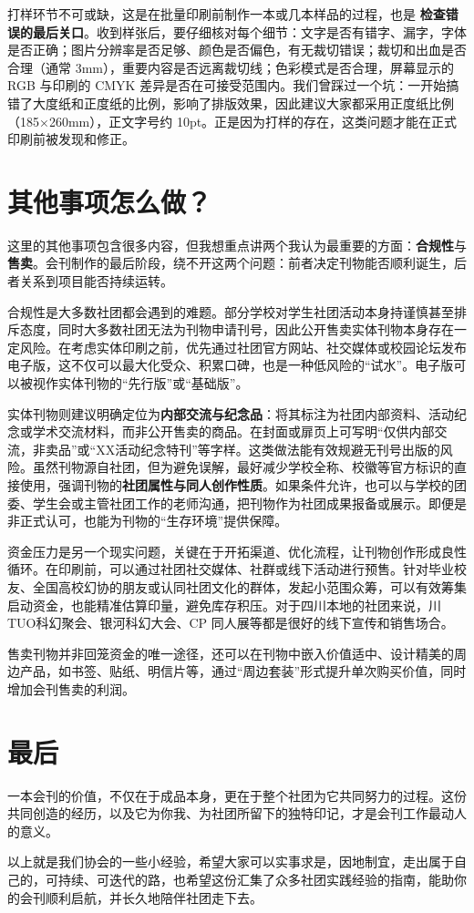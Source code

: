 打样环节不可或缺，这是在批量印刷前制作一本或几本样品的过程，也是
\textbf{检查错误的最后关口}。收到样张后，要仔细核对每个细节：文字是否有错字、漏字，字体是否正确；图片分辨率是否足够、颜色是否偏色，有无裁切错误；裁切和出血是否合理（通常
3mm），重要内容是否远离裁切线；色彩模式是否合理，屏幕显示的 RGB 与印刷的
CMYK
差异是否在可接受范围内。我们曾踩过一个坑：一开始搞错了大度纸和正度纸的比例，影响了排版效果，因此建议大家都采用正度纸比例（185×260mm），正文字号约
10pt。正是因为打样的存在，这类问题才能在正式印刷前被发现和修正。

\section{其他事项怎么做？}\label{ux5176ux4ed6ux4e8bux9879ux600eux4e48ux505a}

这里的其他事项包含很多内容，但我想重点讲两个我认为最重要的方面：\textbf{合规性}与\textbf{售卖}。会刊制作的最后阶段，绕不开这两个问题：前者决定刊物能否顺利诞生，后者关系到项目能否持续运转。

合规性是大多数社团都会遇到的难题。部分学校对学生社团活动本身持谨慎甚至排斥态度，同时大多数社团无法为刊物申请刊号，因此公开售卖实体刊物本身存在一定风险。在考虑实体印刷之前，优先通过社团官方网站、社交媒体或校园论坛发布电子版，这不仅可以最大化受众、积累口碑，也是一种低风险的``试水''。电子版可以被视作实体刊物的``先行版''或``基础版''。

实体刊物则建议明确定位为\textbf{内部交流与纪念品}：将其标注为社团内部资料、活动纪念或学术交流材料，而非公开售卖的商品。在封面或扉页上可写明``仅供内部交流，非卖品''或``XX活动纪念特刊''等字样。这类做法能有效规避无刊号出版的风险。虽然刊物源自社团，但为避免误解，最好减少学校全称、校徽等官方标识的直接使用，强调刊物的\textbf{社团属性与同人创作性质}。如果条件允许，也可以与学校的团委、学生会或主管社团工作的老师沟通，把刊物作为社团成果报备或展示。即便是非正式认可，也能为刊物的``生存环境''提供保障。

资金压力是另一个现实问题，关键在于开拓渠道、优化流程，让刊物创作形成良性循环。在印刷前，可以通过社团社交媒体、社群或线下活动进行预售。针对毕业校友、全国高校幻协的朋友或认同社团文化的群体，发起小范围众筹，可以有效筹集启动资金，也能精准估算印量，避免库存积压。对于四川本地的社团来说，川TUO科幻聚会、银河科幻大会、CP
同人展等都是很好的线下宣传和销售场合。

售卖刊物并非回笼资金的唯一途径，还可以在刊物中嵌入价值适中、设计精美的周边产品，如书签、贴纸、明信片等，通过``周边套装''形式提升单次购买价值，同时增加会刊售卖的利润。

\section{最后}\label{ux6700ux540e}

一本会刊的价值，不仅在于成品本身，更在于整个社团为它共同努力的过程。这份共同创造的经历，以及它为你我、为社团所留下的独特印记，才是会刊工作最动人的意义。

以上就是我们协会的一些小经验，希望大家可以实事求是，因地制宜，走出属于自己的，可持续、可迭代的路，也希望这份汇集了众多社团实践经验的指南，能助你的会刊顺利启航，并长久地陪伴社团走下去。